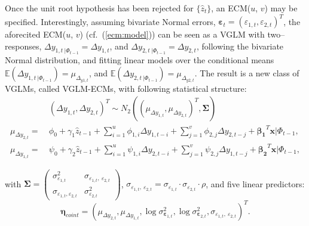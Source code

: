 \documentclass[a4paper, 11pt]{article}\usepackage[]{graphicx}\usepackage[]{color}
\begin{document}
 \vspace{2mm}
 Once the unit root hypothesis has been rejected for
 $\{ \widehat{z}_t \}$, an
 ECM($u$, $v$) may be specified.
 Interestingly, assuming bivariate Normal errors,
$\mathbold{\varepsilon}_t = (\varepsilon_{1, t},
\varepsilon_{2, t})^T$, the aforecited ECM($u$, $v$) 
(cf.~(\ref{ecm:model})) can be seen as a VGLM with two--responses,
$ \Delta y_{1, t~|\Phi_{t - 1}} = 
\Delta y_{1 , t} $, and
$ \Delta y_{2, t~| \Phi_{t - 1}} =
\Delta y_{2, t} $, following the bivariate Normal distribution, 
and fitting linear models 
over the conditional means $\mathbb{E}(\Delta y_{1, t~|\Phi_{t - 1}} ) =
\mu_{\Delta_{y1, t}}$, and
$\mathbb{E}(\Delta y_{2, t~|\Phi_{t - 1}} ) =
\mu_{\Delta_{y2, t}}$.
The result is a new class of VGLMs, called
VGLM-ECMs, with following statistical structure:
\begin{align} \label{coint:vglmfinal}
&~(\Delta y_{1, t},
\Delta y_{2, t} )^T \sim
N_2((\mu_{\Delta y_{1, t}},
\mu_{\Delta y_{2, t}})^T,
\mathrm{\mathbf{\Sigma}}) \\
\nonumber
\mu_{\Delta y_{2, t}}
=&~\phi_0 + \gamma_1 \widehat{z}_{t - 1} +
\sum_{i = 1}^u \phi_{1, i} \Delta y_{1, t - i} +
\sum_{j = 1}^v \phi_{2, j} \Delta y_{2, t - j} +
\boldsymbol{\beta_1}^T \mathbold{x} | \Phi_{t - 1}, \\
\nonumber
\mu_{\Delta y_{1, t}}
=&~\psi_0 + \gamma_2 \widehat{z}_{t - 1} +
\sum_{i = 1}^u \psi_{1, i} \Delta y_{2, t - i} +
\sum_{j = 1}^v \psi_{2, j} \Delta y_{1, t - j} +
\boldsymbol{\beta_2}^T \mathbold{x} | \Phi_{t - 1},
\end{align}

\noindent 
with $\mathrm{\mathbf{\Sigma}} = 
\left(
 \begin{matrix}
   \sigma^2_{\varepsilon_{1, t}} & \sigma_{\varepsilon_{1, t},~
   \varepsilon_{2, t}} \\
    \sigma_{\varepsilon_{1, t},
   \varepsilon_{2, t}} & \sigma^2_{\varepsilon_{2, t}}
 \end{matrix}
\right)
$,
$ \sigma_{\varepsilon_{1, t},~
   \varepsilon_{2, t}} = \sigma_{\varepsilon_{1, t}} \cdot
   \sigma_{\varepsilon_{2, t}} \cdot \rho$,
   and five linear predictors:
$$
\mathbold{\eta}_{coint} = (\mu_{\Delta y_{2, t}}, 
\mu_{\Delta y_{1, t}},
\log \sigma^2_{\mathbold{\varepsilon}_{1, t}},
\log \sigma^2_{\mathbold{\varepsilon}_{2, t}},
\sigma_{\varepsilon_{1, t},~\varepsilon_{2, t}})^T.
$$
\end{document}
